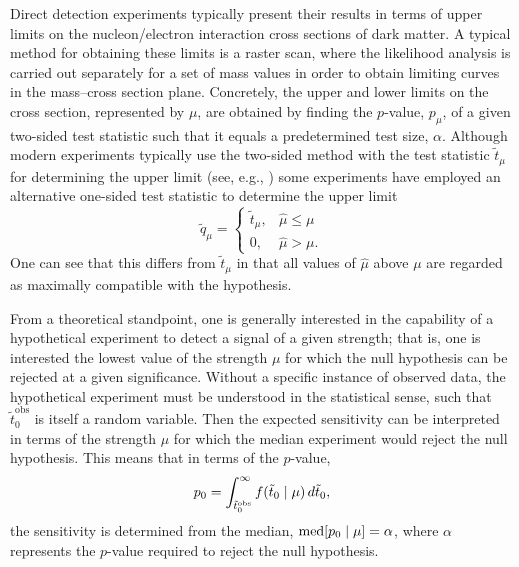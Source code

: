 Direct detection experiments typically present their results in terms of upper limits on the nucleon/electron interaction cross sections of dark matter. A typical method for obtaining these limits is a raster scan, where the likelihood analysis is carried out separately for a set of mass values in order to obtain limiting curves in the mass--cross section plane. Concretely, the upper and lower limits on the cross section, represented by $\mu$, are obtained by finding the $p$-value, $p_\mu$, of a given two-sided test statistic such that it equals a predetermined test size, $\alpha$. Although modern experiments typically use the two-sided method with the test statistic $\tilde{t}_\mu$ for determining the upper limit (see, e.g., \textcites{XENON2019b, PandaX2021, LZ2024}) some experiments have employed an alternative one-sided test statistic to determine the upper limit \parencite{CowanEtAl2011}
\begin{equation}
    \tilde{q}_\mu=
    \begin{cases}
        \tilde{t}_\mu,&\hat{\mu}\leq\mu\\
        0,&\hat{\mu}>\mu.
    \end{cases}
\end{equation}
One can see that this differs from $\tilde{t}_\mu$ in that all values of $\hat{\mu}$ above $\mu$ are regarded as maximally compatible with the hypothesis.

From a theoretical standpoint, one is generally interested in the capability of a hypothetical experiment to detect a signal of a given strength; that is, one is interested the lowest value of the strength $\mu$ for which the null hypothesis can be rejected at a given significance. Without a specific instance of observed data, the hypothetical experiment must be understood in the statistical sense, such that $\tilde{t}_0^\text{obs}$ is itself a random variable. Then the expected sensitivity can be interpreted in terms of the strength $\mu$ for which the median experiment would reject the null hypothesis. This means that in terms of the $p$-value,
\begin{equation}
    p_0=\int_{\tilde{t}_0^\text{obs}}^\infty f(\tilde{t}_0\mid\mu)\,d\tilde{t}_0,
\end{equation}
the sensitivity is determined from the median, $\operatorname{med}[p_0\mid\mu]=\alpha$, where $\alpha$ represents the $p$-value required to reject the null hypothesis.

